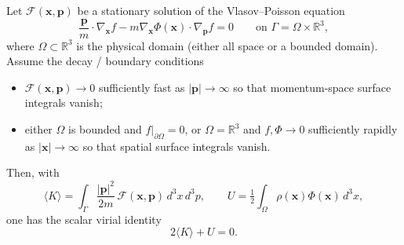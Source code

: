 \documentclass[10pt,a4paper]{amsart}
\begin{document}
\begin{lem}
Let $\mathcal{F}(\mathbf{x},\mathbf{p})$ be a stationary solution of the Vlasov--Poisson equation
\begin{equation}
\frac{\mathbf{p}}{m}\!\cdot\!\nabla_{\mathbf{x}} f - m\nabla_{\mathbf{x}}\Phi(\mathbf{x})\!\cdot\!\nabla_{\mathbf{p}} f = 0
\qquad\text{on }\Gamma=\Omega\times\mathbb{R}^3,
\end{equation}
where $\Omega\subset\mathbb{R}^3$ is the physical domain (either all space or a bounded domain). Assume the decay / boundary conditions
\begin{itemize}
  \item $\mathcal{F}(\mathbf{x},\mathbf{p})\to 0$ sufficiently fast as $|\mathbf{p}|\to\infty$ so that momentum-space surface integrals vanish;
  \item either $\Omega$ is bounded and $f|_{\partial\Omega}=0$, or $\Omega=\mathbb{R}^3$ and $f,\Phi\to 0$ sufficiently rapidly as $|\mathbf{x}|\to\infty$ so that spatial surface integrals vanish.
\end{itemize}
Then, with
\begin{equation}
\langle {K}\rangle = \int_{\Gamma}\frac{|\mathbf{p}|^2}{2m}\,\mathcal{F}(\mathbf{x},\mathbf{p})\,d^3x\,d^3p,
\qquad
U = \tfrac12\int_{\Omega}\rho(\mathbf{x})\Phi(\mathbf{x})\,d^3x,
\end{equation}
one has the scalar virial identity
\begin{equation}
2\langle {K}\rangle + U = 0.
\end{equation}
\end{lem}
\end{document}
